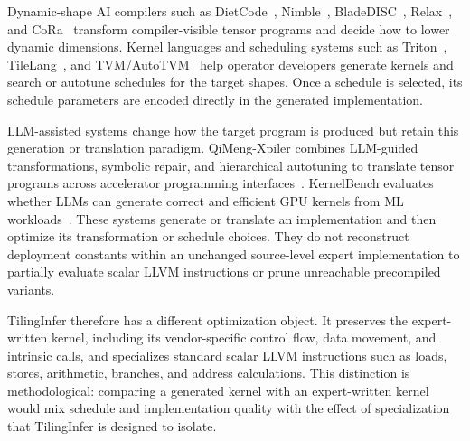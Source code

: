 {\color{blue}%
Dynamic-shape AI compilers such as DietCode~\cite{zheng2022dietcode}, Nimble~\cite{shen2021nimble}, BladeDISC~\cite{zheng2023bladedisc}, Relax~\cite{Lai2023RelaxCA}, and CoRa~\cite{fegade2022cora} transform compiler-visible tensor programs and decide how to lower dynamic dimensions. Kernel languages and scheduling systems such as Triton~\cite{tillet2019triton}, TileLang~\cite{tilelang}, and TVM/AutoTVM~\cite{chen2018tvm} help operator developers generate kernels and search or autotune schedules for the target shapes. Once a schedule is selected, its schedule parameters are encoded directly in the generated implementation.
\par}

{\color{red}%
\cite{ansel2024dynamo}\cite{nvidia2021tensorrt}\cite{ye2025flashinfer}\cite{ascend_cannopsadv}
\par}

{\color{blue}%
LLM-assisted systems change how the target program is produced but retain this generation or translation paradigm. QiMeng-Xpiler combines LLM-guided transformations, symbolic repair, and hierarchical autotuning to translate tensor programs across accelerator programming interfaces~\cite{dong2025qimengxpiler}. KernelBench evaluates whether LLMs can generate correct and efficient GPU kernels from ML workloads~\cite{ouyang2025kernelbench}. These systems generate or translate an implementation and then optimize its transformation or schedule choices. They do not reconstruct deployment constants within an unchanged source-level expert implementation to partially evaluate scalar LLVM instructions or prune unreachable precompiled variants.
\par}

{\color{blue}%
TilingInfer therefore has a different optimization object. It preserves the expert-written kernel, including its vendor-specific control flow, data movement, and intrinsic calls, and specializes standard scalar LLVM instructions such as loads, stores, arithmetic, branches, and address calculations. This distinction is methodological: comparing a generated kernel with an expert-written kernel would mix schedule and implementation quality with the effect of specialization that TilingInfer is designed to isolate.
\par}
